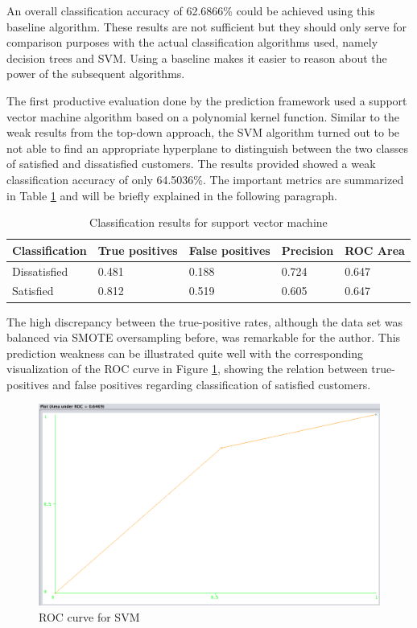 An overall classification accuracy of 62.6866\% could be achieved using this baseline algorithm. These results are not sufficient but they should only serve for comparison purposes with the actual classification algorithms used, namely decision trees and SVM. Using a baseline makes it easier to reason about the power of the subsequent algorithms. 

The first productive evaluation done by the prediction framework used a support vector machine algorithm based on a polynomial kernel function. Similar to the weak results from the top-down approach, the SVM algorithm turned out to be not able to find an appropriate hyperplane to distinguish between the two classes of satisfied and dissatisfied customers. The results provided showed a weak classification accuracy of only 64.5036\%. The important metrics are summarized in Table \ref{tab:svmResults} and will be briefly explained in the following paragraph. 

\begin{table}[]
	\centering
	\begin{tabular}{|l|l|l|l|l|}
		\hline
		\textbf{Classification} & \textbf{True positives} & \textbf{False positives} & \textbf{Precision} & \textbf{ROC Area} \\ \hline
		Dissatisfied            & 0.481                  & 0.188                    & 0.724              & 0.647             \\ \hline
		Satisfied               & 0.812                   & 0.519                    & 0.605                & 0.647             \\ \hline
	\end{tabular}
	\caption{Classification results for support vector machine}
	\label{tab:svmResults}
\end{table}

The high discrepancy between the true-positive rates, although the data set was balanced via SMOTE oversampling before, was remarkable for the author. This prediction weakness can be illustrated quite well with the corresponding visualization of the ROC curve in Figure \ref{fig:rocCurveSVM}, showing the relation between true-positives and false positives regarding classification of satisfied customers. 

\begin{figure}
	\centering
	\includegraphics[width=1.0\textwidth]{img/rocResultSVM.png}
	\caption{ROC curve for SVM}
	\label{fig:rocCurveSVM}
\end{figure}

